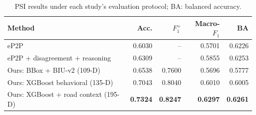 \begin{table}[htbp]
\centering
\caption{PSI results under each study's evaluation protocol; BA: balanced accuracy.}\label{tab:ch4_literature_psi}
\begin{tabularx}{\textwidth}{@{}Xrrrr@{}}\toprule
\textbf{Method} & \textbf{Acc.} & \textbf{\boldmath $F_1^{+}$} & \textbf{\boldmath Macro-$F_1$} & \textbf{BA} \\[3pt]
\midrule

eP2P~\cite{Jing2025PSI} & 0.6030 & -- & 0.5701 & 0.6226\\[3pt]
eP2P + disagreement + reasoning~\cite{Jing2025PSI} & 0.6309 & -- & 0.5855 & 0.6253\\[3pt]
\midrule
Ours: BBox + BIU-v2 (109-D) & 0.6538 & 0.7600 & 0.5696 & 0.5777\\[3pt]
Ours: XGBoost behavioral (135-D) & 0.7043 & 0.8040 & 0.6010 & 0.6005\\[3pt]
Ours: XGBoost + road context (195-D) & \textbf{0.7324} & \textbf{0.8247} & \textbf{0.6297} & \textbf{0.6261}\\[3pt]
\bottomrule
\end{tabularx}
\end{table}
